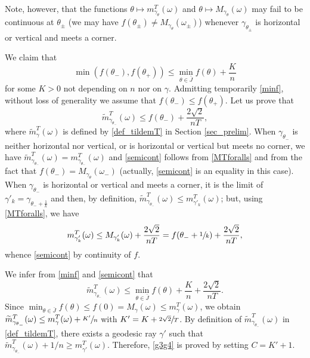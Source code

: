 \documentclass[10pt]{amsart}
\theoremstyle{definition}
\begin{document}
Note, however, that the functions $\theta\mapsto m_{\gamma_\theta}^T(\omega)$ and $\theta\mapsto M_{\gamma_\theta}(\omega)$ may fail to be continuous at $\theta_\pm$ (\ie we may have $f(\theta_\pm)\neq M_{\gamma_\theta}(\omega_\pm)$) whenever $\gamma_{\theta_\pm}$ is horizontal or vertical and meets a corner.

We claim that
\begin{equation} \label{minf}
\min(f(\theta_-), f(\theta_+)) \leq \min_{\theta\in\bar J} f(\theta) +\frac{K}{n}
\end{equation}
for some $K>0$ not depending on $n$ nor on $\gamma$.
Admitting temporarily \eqref{minf}, without loss of generality we assume that $f(\theta_-) \leq f(\theta_+ )$.
Let us prove that
\begin{equation} \label{semicont}
\widetilde m^T_{\gamma_{\theta_-}}(\omega) \leq f(\theta_-) + \frac{2 \sqrt{2}}{nT},
\end{equation}
where $\widetilde m^T_{\gamma}(\omega)$ is defined by \eqref{def_tildemT} in Section \ref{sec_prelim}.
When $\gamma_{\theta_-}$ is neither horizontal nor vertical, or is horizontal or vertical but meets no corner, we have $\widetilde m^T_{\gamma_{\theta_-}}(\omega) = m^T_{\gamma_{\theta_-}}(\omega)$ and \eqref{semicont} follows from \eqref{MTforalls} and from the fact that $f(\theta_-) = M_{\gamma_\theta}(\omega_-)$ (actually, \eqref{semicont} is an equality in this case).
When $\gamma_{\theta_-}$ is horizontal or vertical and meets a corner, it is the limit of $\gamma'_k = \gamma_{\theta_- + \frac{1}{k}}$ and then, by definition, $\widetilde m^T_{\gamma_{\theta_-}}(\omega) \leq m_{\gamma'_k}^T(\omega)$; but, using \eqref{MTforalls}, we have
\[
m_{\gamma'_k}^T(\omega) \leq M_{\gamma'_k}(\omega)+\frac{2\sqrt{2}}{nT} = f(\theta_-+\sfrac{1}{k})+\frac{2\sqrt{2}}{nT},
\]
whence \eqref{semicont} by continuity of $f$.

We infer from \eqref{minf} and \eqref{semicont} that
\[
\widetilde m^T_{\gamma_{\theta_-}}(\omega) \leq \min_{\theta\in\bar J} f(\theta) +\frac{K}{n} + \frac{2 \sqrt{2}}{nT}.
\]
Since $\min_{\theta\in\bar J} f(\theta) \leq f(0) = M_{\gamma}(\omega) \leq m^T_\gamma(\omega)$, we obtain
$\widetilde m^T_{\gamma_{\theta_-}}(\omega) \leq m^T_\gamma(\omega) +\sfrac{K'}{n}$
with $K'= K +\sfrac{2 \sqrt{2}}{T}$. By definition of $\widetilde m^T_{\gamma_{\theta_-}}(\omega)$ in \eqref{def_tildemT}, there exists a geodesic ray $\gamma'$ such that $\widetilde m^T_{\gamma_{\theta_-}}(\omega)+1/n \geq m^T_{\gamma'}(\omega)$.
Therefore, \eqref{g3g4} is proved by setting $C=K'+1$.
\end{document}
